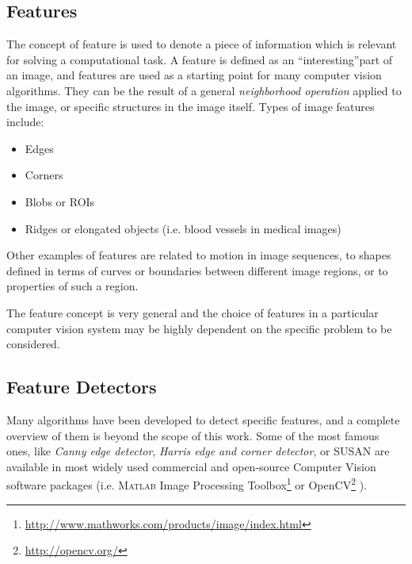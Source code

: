 \vspace{0.5cm}


\subsection{Features}

The concept of feature is used to denote a piece of information which is relevant for solving a computational task\cite{featExtractionAndImageProcessingBook}.
A feature is defined as an \textquotedblleft{interesting}\textquotedblright part of an image, and features are used as a starting point for many computer vision algorithms.
They can be the result of a general \textit{neighborhood operation}\cite{jahne2000computer} applied to the image, or specific structures in the image itself.
Types of image features include:
\begin{itemize}
 \item Edges
 \item Corners
 \item Blobs or \Glspl{ROI}
 \item Ridges or elongated objects (i.e. blood vessels in medical images)
\end{itemize}

Other examples of features are related to motion in image sequences, to shapes defined in terms
of curves or boundaries between different image regions, or to properties of such a region\cite{MVG_Hartley2004}.

The feature concept is very general and the choice of features in a particular computer vision system may be highly dependent on the specific problem to be considered.\\


\subsection{Feature Detectors}

Many algorithms have been developed to detect specific features, and a complete overview of them is beyond
the scope of this work. Some of the most famous ones, like \textit{Canny edge detector}\cite{canny},
\textit{Harris edge and corner detector}, or SUSAN \cite{detectSusan} are available in most widely used
commercial and open-source Computer Vision software packages (i.e. {\scshape Matlab}
Image Processing Toolbox\footnote{\url{http://www.mathworks.com/products/image/index.html}} or OpenCV\footnote{\url{http://opencv.org/}} ).\\

